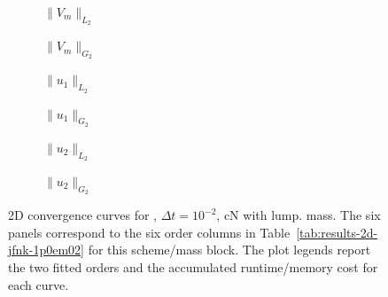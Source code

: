 \begin{figure}[p]
\centering
\begin{subfigure}{0.485\linewidth}
\centering
{}
\caption{$\|V_m\|_{L_2}$}
\label{fig:results-2d-jfnk-1p0em02-cranknicolson-lumped-a}
\end{subfigure}
\hfill
\begin{subfigure}{0.485\linewidth}
\centering
{}
\caption{$\|V_m\|_{G_2}$}
\label{fig:results-2d-jfnk-1p0em02-cranknicolson-lumped-b}
\end{subfigure}
\par\vspace{0.8em}
\begin{subfigure}{0.485\linewidth}
\centering
{}
\caption{$\|u_1\|_{L_2}$}
\label{fig:results-2d-jfnk-1p0em02-cranknicolson-lumped-c}
\end{subfigure}
\hfill
\begin{subfigure}{0.485\linewidth}
\centering
{}
\caption{$\|u_1\|_{G_2}$}
\label{fig:results-2d-jfnk-1p0em02-cranknicolson-lumped-d}
\end{subfigure}
\par\vspace{0.8em}
\begin{subfigure}{0.485\linewidth}
\centering
{}
\caption{$\|u_2\|_{L_2}$}
\label{fig:results-2d-jfnk-1p0em02-cranknicolson-lumped-e}
\end{subfigure}
\hfill
\begin{subfigure}{0.485\linewidth}
\centering
{}
\caption{$\|u_2\|_{G_2}$}
\label{fig:results-2d-jfnk-1p0em02-cranknicolson-lumped-f}
\end{subfigure}
\caption{2D convergence curves for , $\Delta t=10^{-2}$, cN with lump. mass. The six panels correspond to the six order columns in Table~\ref{tab:results-2d-jfnk-1p0em02} for this scheme/mass block. The plot legends report the two fitted orders and the accumulated runtime/memory cost for each curve.}
\label{fig:results-2d-jfnk-1p0em02-cranknicolson-lumped}
\end{figure}
\FloatBarrier

